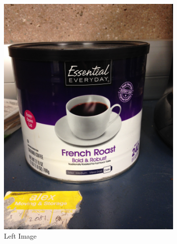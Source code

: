 \documentclass[11pt,psfig]{article}
\begin{document}
\begin{figure}
        \centering
        \begin{subfigure}[b]{0.4\textwidth}
                \includegraphics[width=\textwidth]{coffeeCan1.jpg}
		\caption{Left Image}
        \end{subfigure}
        \begin{subfigure}[b]{0.4\textwidth}

\end{subfigure}
\end{figure}
\end{document}
